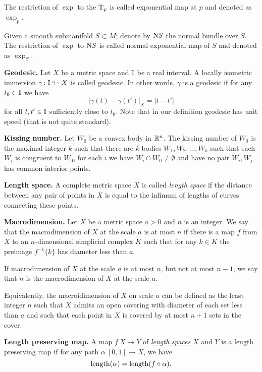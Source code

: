 \begin{description}
The restriction of $\exp$ to the $\mathrm{T}_p$ is called exponential map at $p$ and denoted as $\exp_p$.

Given a smooth submanifold $S\subset M$;
denote by $\mathrm{\rm N} S$ the normal bundle over $S$.
The restriction of $\exp$ to $\mathrm{\rm N} S$ is called normal exponential map of $S$ and denoted as $\exp_S$. 

\item{\bf Geodesic.}\label{Geodesic}  Let $X$ be a metric space and $\mathbb{I}$ be a real interval.
A locally isometric immersion $\gamma\colon\mathbb{I}\looparrowright X$ is called geodesic.
In other words, $\gamma$ is a geodesic if for any $t_0\in\mathbb{I}$ we have 
$$|\gamma(t)-\gamma(t')|_X=|t-t'|$$ 
for all $t,t'\in\mathbb{I}$ sufficiently close to $t_0$.
Note that in our definition geodesic has unit speed 
(that is not quite standard).

\item{\bf Kissing number.}\label{Kissing number}
Let  $W_0$ be a convex body in $\mathbb{R}^n$.
The kissing number of $W_0$ is the maximal integer $k$ such that there are $k$ bodies $W_1,W_2,\dots,W_k$ such that each $W_i$ is congruent to $W_0$,
for each $i$ we have $W_i\cap W_0\not=\emptyset$ and have no pair $W_i,W_j$ has common interior points.

\item{\bf  Length space.}\label{Length space} A complete metric space $X$ is called {\it length space}  if the distance between any pair of points in $X$ is equal to the infimum of lengths of curves connecting these points. 

\item{\bf Macrodimension.}\label{Macrodimension}
Let $X$ be a metric space $a>0$ and $n$ is an integer.
We say that the macrodimension  of $X$ at the scale $a$ is at most $n$
if there is a map $f$ from $X$ to an $n$-dimensional simplicial complex $K$
such that for any $k\in K$ the preimage $f^{-1}\{k\}$ has diameter less than $a$.

If macrodimension of $X$ at the scale $a$ is at most $n$,
but not at most $n-1$, 
we say that $n$ is the macrodimension of $X$ at the scale $a$.

Equivalently, the macroidimension of $X$ on scale $a$ can be defined as 
the least integer $n$ such that $X$ admits an open covering with diameter of each set less than $a$ 
and such that each point in $X$ is covered by at most $n+1$ sets in the cover.


\item{\bf Length preserving map.}\label{Length preserving map} A map $f\:X\to Y$ of \hyperref[Length space]{\emph{length spaces}} $X$ and $Y$ is a length preserving map if for any path $\alpha\:[0,1]\to X$, we have 
$$\operatorname{\rm length}(\alpha)=\operatorname{\rm length}(f\circ\alpha).$$


\end{description}
